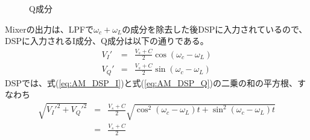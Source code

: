 \begin{figure}
\begin{minipage}{0.5\hsize}
\caption{Q成分}
\end{minipage}
\end{figure}
Mixerの出力は、LPFで$\omega_c + \omega_L$の成分を除去した後DSPに入力されているので、DSPに入力されるI成分、Q成分は以下の通りである。
\begin{eqnarray}
V_I' &=& \frac{V_s+C}{2}\cos(\omega_c - \omega_L) \label{eq:AM_DSP_I}\\
V_Q' &=& \frac{V_s+C}{2}\sin(\omega_c - \omega_L) \label{eq:AM_DSP_Q}
\end{eqnarray}
DSPでは、式(\ref{eq:AM_DSP_I})と式(\ref{eq:AM_DSP_Q})の二乗の和の平方根、すなわち
\begin{eqnarray}
\sqrt{V_I'^2 + V_Q'^2} &=& \frac{V_s+C}{2}\sqrt{\cos^2(\omega_c - \omega_L)t + \sin^2(\omega_c - \omega_L)t }\\
&=& \frac{V_s+C}{2} 
\end{eqnarray}
